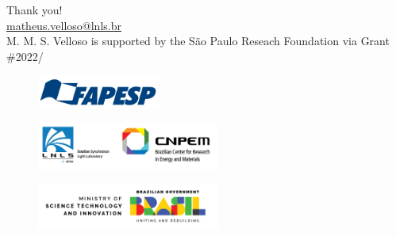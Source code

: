\documentclass[aspectratio=169]{beamer}
\begin{document}
\begin{frame}[plain]
    Thank you!\\
    \vfill
    \url{matheus.velloso@lnls.br}\\
    \vfill
    M. M. S. Velloso is supported by the São Paulo Reseach Foundation via Grant \#2022/
    \begin{figure}
        \centering
        \includegraphics[width=4cm]{fapesp.png}
    \end{figure}
    \begin{minipage}{0.49\textwidth}
        \begin{figure}
            \includegraphics[width=6cm]{cnpem_lnls.png}
        \end{figure}
    \end{minipage}
    \begin{minipage}{0.49\textwidth}
        \begin{figure}
            \includegraphics[width=6cm]{mcti.png}
        \end{figure}
    \end{minipage}
    \vfill
    
\end{frame}
\end{document}
